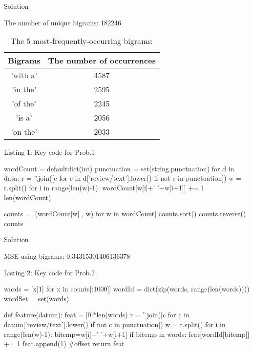\documentclass{assignment}
\date{March 6, 2017}
\begin{document}
\begin{problemlist}




\pbitem Solution

The number of unique bigrams: 182246
\begin{table}[h]
\vspace{2ex}
\centering
\caption{The 5 most-frequently-occurring bigrams:}
\vspace{1ex}

\begin{tabular}{|c|c|}
\hline
Bigrams & The number of occurrences \\
\hline
'with a' & 4587\\
\hline
'in the' & 2595 \\
\hline
'of the' & 2245 \\
\hline
'is a' & 2056 \\
\hline
'on the' & 2033 \\
\hline
\end{tabular}
\end{table}


\vspace{2ex}
\begin{center} 
Listing 1: Key code for Prob.1
\end{center}
\begin{python}
wordCount = defaultdict(int)
punctuation = set(string.punctuation)
for d in data:
  r = ''.join([c for c in d['review/text'].lower() if not c in punctuation])
  w = r.split()
  for i in range(len(w)-1):
    wordCount[w[i]+' '+w[i+1]] += 1
len(wordCount)

counts = [(wordCount[w] , w) for w in wordCount]
counts.sort()
counts.reverse()
counts
\end{python}

\vspace{3ex}

\pbitem Solution

MSE using bigrams: 0.34315301406136378


\begin{center} 
Listing 2: Key code for Prob.2
\end{center}
\begin{python}
words = [x[1] for x in counts[:1000]]
wordId = dict(zip(words, range(len(words))))
wordSet = set(words)

def feature(datum):
  feat = [0]*len(words)
  r = ''.join([c for c in datum['review/text'].lower() if not c in punctuation])
  w = r.split()
  for i in range(len(w)-1):
    bitemp=w[i]+' '+w[i+1]
    if bitemp in words:
      feat[wordId[bitemp]] += 1
  feat.append(1) #offset
  return feat


\end{python}
\end{problemlist}
\end{document}
